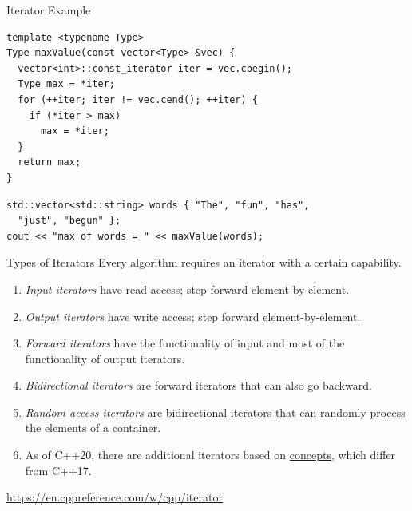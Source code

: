 \documentclass[14pt,aspectratio=1610]{beamer}
\begin{document}
\begin{frame}[fragile]{Iterator Example}
  \small
\begin{lstlisting}
template <typename Type>
Type maxValue(const vector<Type> &vec) {
  vector<int>::const_iterator iter = vec.cbegin();
  Type max = *iter;
  for (++iter; iter != vec.cend(); ++iter) {
    if (*iter > max)
      max = *iter;
  }
  return max;
}
\end{lstlisting}

\begin{lstlisting}
std::vector<std::string> words { "The", "fun", "has",
  "just", "begun" };
cout << "max of words = " << maxValue(words);
\end{lstlisting}
\end{frame}

\begin{frame}[fragile]{Types of Iterators}
Every algorithm requires an iterator with a certain capability.
\begin{enumerate}[<+->]
\item
  \emph{Input iterators} have read access; step forward element-by-element.
\item
  \emph{Output iterators} have write access; step forward element-by-element.
\item
  \emph{Forward iterators} have the functionality of input and most of the functionality of output iterators.
\item
  \emph{Bidirectional iterators} are forward iterators that can also go backward.
\item
  \emph{Random access iterators} are bidirectional iterators that can randomly process the elements of a container.
\item As of C++20, there are additional iterators based on \href{https://en.cppreference.com/w/cpp/language/constraints}{concepts}, which differ from C++17.
\end{enumerate}

\href{https://en.cppreference.com/w/cpp/iterator}{https://en.cppreference.com/w/cpp/iterator}
\end{frame}
\end{document}
